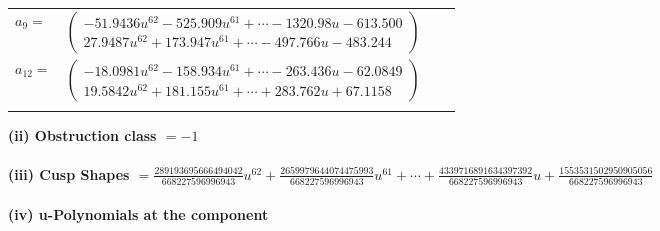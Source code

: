 \documentclass[1p]{elsarticle_modified}
\theoremstyle{definition}
\begin{document}
\begin{tabular}{m{7pt} m{180pt} m{7pt} m{180pt} }
\flushright $a_{9}=$&$\begin{pmatrix}-51.9436 u^{62}-525.909 u^{61}+\cdots-1320.98 u-613.500\\27.9487 u^{62}+173.947 u^{61}+\cdots-497.766 u-483.244\end{pmatrix}$ \\
\flushright $a_{12}=$&$\begin{pmatrix}-18.0981 u^{62}-158.934 u^{61}+\cdots-263.436 u-62.0849\\19.5842 u^{62}+181.155 u^{61}+\cdots+283.762 u+67.1158\end{pmatrix}$\\&\end{tabular}
\flushleft \textbf{(ii) Obstruction class $= -1$}\\~\\
\flushleft \textbf{(iii) Cusp Shapes $= \frac{289193695666494042}{668227596996943} u^{62}+\frac{2659979644074475993}{668227596996943} u^{61}+\cdots+\frac{4339716891634397392}{668227596996943} u+\frac{1553531502950905056}{668227596996943}$}\\~\\
\newpage\renewcommand{\arraystretch}{1}
\flushleft \textbf{(iv) u-Polynomials at the component}\newline \\
\end{document}
